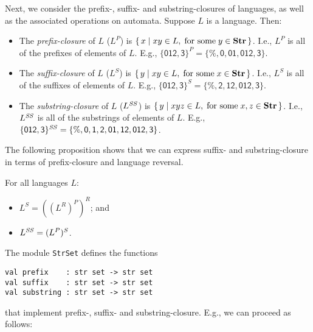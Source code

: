 Next, we consider the prefix-, suffix- and substring-closures of
%
%
%
languages, as well as the associated operations on automata.  Suppose
$L$ is a language.  Then:
\begin{itemize}
\item The \emph{prefix-closure} of $L$ ($L^P$) is $\{ \, x \mid xy\in L,
\;\allowbreak\mbox{for some}\allowbreak\;y\in\mathbf{Str} \, \}$.  I.e., $L^P$ is all of the prefixes
of elements of $L$.  E.g., $\{\mathsf{012,3}\}^P =
\{\mathsf{\%,0,01,012,3}\}$.

\item The \emph{suffix-closure} of $L$ ($L^S$) is $\{ \, y \mid xy\in L,
\;\allowbreak\mbox{for some}\allowbreak\;x\in\mathbf{Str} \, \}$.  I.e., $L^S$ is all of the suffixes
of elements of $L$.  E.g., $\{\mathsf{012,3}\}^S =
\{\mathsf{\%,2,12,012,3}\}$.

\item The \emph{substring-closure} of $L$ ($L^{\mathit{SS}}$) is $\{ \, y \mid xyz\in L,
\;\allowbreak\mbox{for some}\allowbreak\;x,z\in\mathbf{Str} \, \}$.  I.e., $L^{\mathit{SS}}$ is all of the substrings
of elements of $L$.  E.g., $\{\mathsf{012,3}\}^{\mathit{SS}} =
\{\mathsf{\%, 0, 1, 2, 01, 12, 012, 3}\}$.
\end{itemize}

The following proposition shows that we can express suffix- and
substring-closure in terms of prefix-closure and language reversal.

\begin{proposition}
\label{PrefixSuffixSubstringClosure}
For all languages $L$:
\begin{itemize}
\item $L^S = ((L^R)^P)^R$; and

\item $L^{\mathit{SS}} = (L^P)^S$.
\end{itemize}
\end{proposition}

The module \texttt{StrSet}
%
defines the functions
\begin{verbatim}
val prefix    : str set -> str set
val suffix    : str set -> str set
val substring : str set -> str set
\end{verbatim}
%
%
%
that implement prefix-, suffix- and substring-closure. 
E.g., we can proceed as follows:


